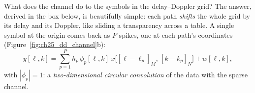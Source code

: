 What does the channel do to the symbols in the delay--Doppler grid? The answer, derived in the box
below, is beautifully simple: each path \emph{shifts} the whole grid by its delay and its Doppler,
like sliding a transparency across a table. A single symbol at the origin comes back as $P$ spikes,
one at each path's coordinates (Figure~\ref{fig:ch25_dd_channel}b):
\begin{equation}
y[\ell,k]=\sum_{p=1}^{P}h_p\,\phi_p[\ell,k]\;x\big[[\ell-\ell_p]_M,\,[k-k_p]_N\big]+w[\ell,k],
\label{eq:ch25:ddio}
\end{equation}
with $|\phi_p|=1$: a \emph{two-dimensional circular convolution} of the data with the sparse channel.


